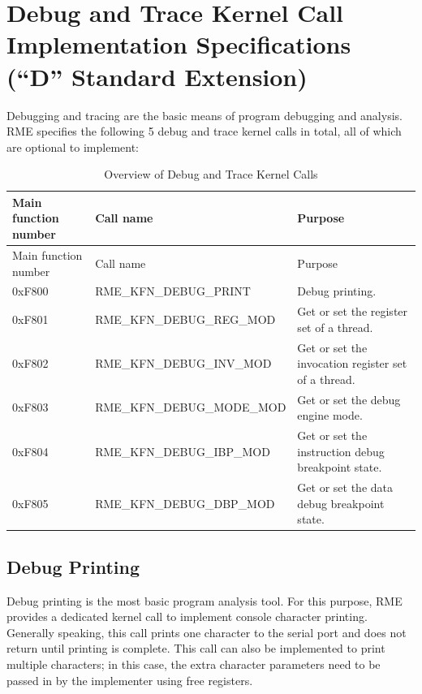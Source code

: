 \section{Debug and Trace Kernel Call Implementation Specifications (``D'' Standard Extension)}\label{sec:8-debug-and-trace-kernel-calls}
\nopagebreak[4]

Debugging and tracing are the basic means of program debugging and analysis. RME specifies the following 5 debug and trace kernel calls in total, all of which are optional to implement:

\begin{xltabular}{\textwidth}{@{}>{\hsize\raggedright\arraybackslash}X>{\hsize\raggedright\arraybackslash}X>{\hsize\raggedright\arraybackslash}X@{}}
\caption{Overview of Debug and Trace Kernel Calls}\label{tab:8-108-debug-and-trace-kernel-calls}\\
\toprule
Main function number & Call name & Purpose\tabularnewline
\endfirsthead
\toprule
Main function number & Call name & Purpose\tabularnewline
\midrule
\endhead
\bottomrule
\endlastfoot
0xF800 & RME\_KFN\_DEBUG\_PRINT & Debug printing.\tabularnewline
0xF801 & RME\_KFN\_DEBUG\_REG\_MOD &
Get or set the register set of a thread.\tabularnewline
0xF802 & RME\_KFN\_DEBUG\_INV\_MOD &
Get or set the invocation register set of a thread.\tabularnewline
0xF803 & RME\_KFN\_DEBUG\_MODE\_MOD &
Get or set the debug engine mode.\tabularnewline
0xF804 & RME\_KFN\_DEBUG\_IBP\_MOD &
Get or set the instruction debug breakpoint state.\tabularnewline
0xF805 & RME\_KFN\_DEBUG\_DBP\_MOD &
Get or set the data debug breakpoint state.\tabularnewline
\end{xltabular}
\nopagebreak[4]

\subsection{Debug Printing}\label{subsec:8-debug-print}

Debug printing is the most basic program analysis tool. For this purpose, RME provides a dedicated kernel call to implement console character printing. Generally speaking, this call prints one character to the serial port and does not return until printing is complete. This call can also be implemented to print multiple characters; in this case, the extra character parameters need to be passed in by the implementer using free registers.

